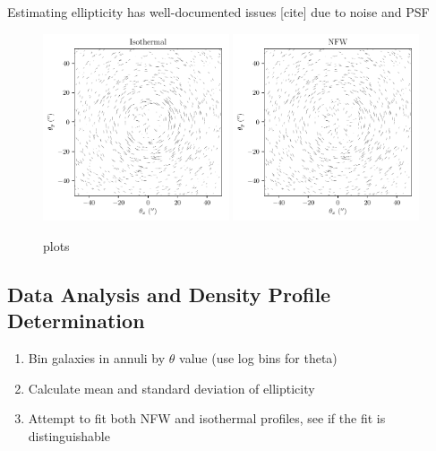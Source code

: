 \documentclass[10pt]{article}
\begin{document}
Estimating ellipticity has well-documented issues [cite] due to noise and PSF


\begin{figure}
    \centering
    \includegraphics[width=0.49\textwidth]{isothermalellipticities.pdf}
    \includegraphics[width=0.49\textwidth]{nfwellipticities.pdf}
    \caption{plots}
    \label{}
\end{figure}


\subsection{Data Analysis and Density Profile Determination}
\begin{enumerate}
\item Bin galaxies in annuli by $\theta$ value (use log bins for theta)
\item Calculate mean and standard deviation of ellipticity
\item Attempt to fit both NFW and isothermal profiles, see if the fit is distinguishable
\end{enumerate}


\end{document}
